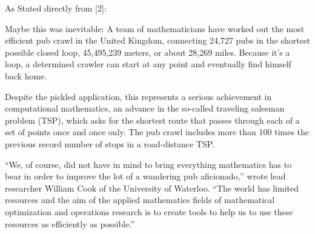 \documentclass[landscape,a0paper,fontscale=0.28]{baposter} %
\newcommand{\tab}{\hspace{0.8cm}}
\begin{document}
\begin{poster}
{\begin{multicols}{2}
\begin{center}
	As Stated directly from [2]:
\end{center}
 	
\tab Maybe this was inevitable: A team of mathematicians have worked out the most efficient pub crawl in the United Kingdom, connecting 24,727 pubs in the shortest possible closed loop, 45,495,239 meters, or about 28,269 miles. Because it's a loop, a determined crawler can start at any point and eventually find himself back home.

\tab Despite the pickled application, this represents a serious achievement in computational mathematics, an advance in the so-called traveling salesman problem (TSP), which asks for the shortest route that passes through each of a set of points once and once only. The pub crawl includes more than 100 times the previous record number of stops in a road-distance TSP.

\tab ``We, of course, did not have in mind to bring everything mathematics has to bear in order to improve the lot of a wandering pub aficionado,'' wrote lead researcher William Cook of the University of Waterloo. ``The world has limited resources and the aim of the applied mathematics fields of mathematical optimization and operations research is to create tools to help us to use these resources as efficiently as possible.''
\end{multicols}
}




\end{poster}
\end{document}
